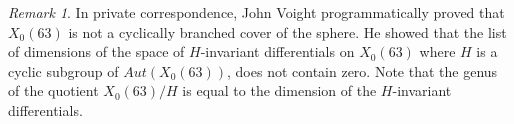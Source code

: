 \documentclass[12pt,reqno]{amsart}
\theoremstyle{definition}
\theoremstyle{remark}
\newtheorem*{remark}{Remark}
\begin{document}
\begin{remark} In private correspondence, John Voight programmatically proved that $X_0(63)$ is not a cyclically branched cover of the sphere. He showed that the list of dimensions of the space of $H$-invariant differentials on $X_0(63)$ where $H$ is a cyclic subgroup of $Aut(X_0(63))$, does not contain zero. Note that the genus of the quotient $X_0(63)/H$ is equal to the dimension of the $H$-invariant differentials.
 \end{remark} 

\end{document}
